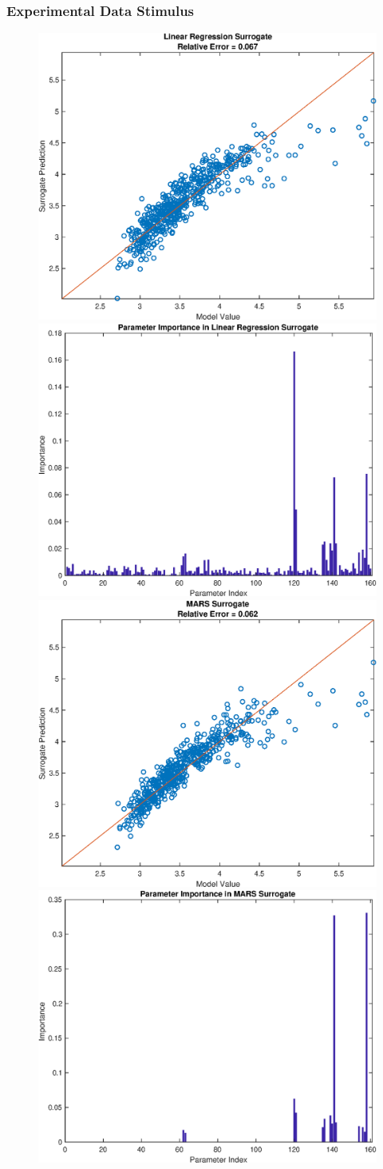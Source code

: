 \documentclass[12pt]{article}
\numberwithin{equation}{section}
\begin{document}
\newpage

\subsubsection{Experimental Data Stimulus}

\begin{figure}[h]
\centering
\includegraphics[width=.49 \textwidth]{Figures/Vol_Flow_QoI_LR_Prediction_Experimental.eps}
\includegraphics[width=.49 \textwidth]{Figures/Vol_Flow_QoI_LR_VI_Experimental.eps}\\
\includegraphics[width=.49 \textwidth]{Figures/Vol_Flow_QoI_MARS_Prediction_Experimental.eps}
\includegraphics[width=.49 \textwidth]{Figures/Vol_Flow_QoI_MARS_VI_Experimental.eps}
\end{figure}
\end{document}
